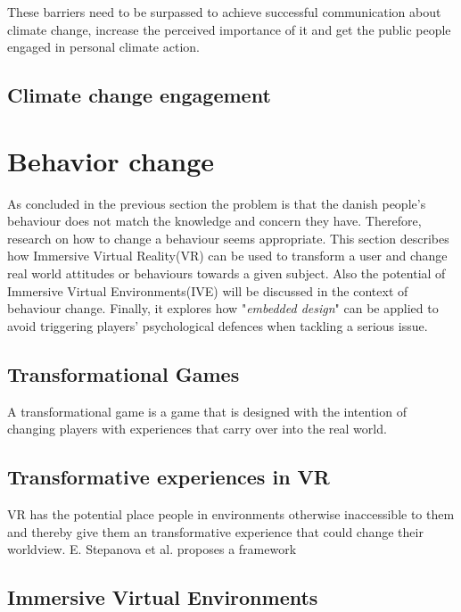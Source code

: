         These barriers need to be surpassed to achieve successful communication about climate change, increase the perceived importance of it and get the public people engaged in personal climate action\cite{the5Ds}.
        
    \subsection{Climate change engagement}
        \cite{reorientingClimageChangeCommunication}\cite{vrEngagementClimateChange}
        
\section{Behavior change}
    As concluded in the previous section the problem is that the danish people's behaviour does not match the knowledge and concern they have. Therefore, research on how to change a behaviour seems appropriate.
    This section describes how Immersive Virtual Reality(VR) can be used to transform a user and change real world attitudes or behaviours towards a given subject. Also the potential of Immersive Virtual Environments(IVE) will be discussed in the context of behaviour change.
    Finally, it explores how "\textit{embedded design}"\cite{embeddedDesignModel} can be applied to avoid triggering players' psychological defences when tackling a serious issue. 
    
    \subsection{Transformational Games}
    A transformational game is a game that is designed with the intention of changing players with experiences that carry over into the real world\cite{transformationalFramework}. 
    
    \subsection{Transformative experiences in VR}
    VR has the potential place people in environments otherwise inaccessible to them and thereby give them an transformative experience that could change their worldview\cite{transformativeVR}. E. Stepanova et al. proposes a framework
    
    
    \subsection{Immersive Virtual Environments}

